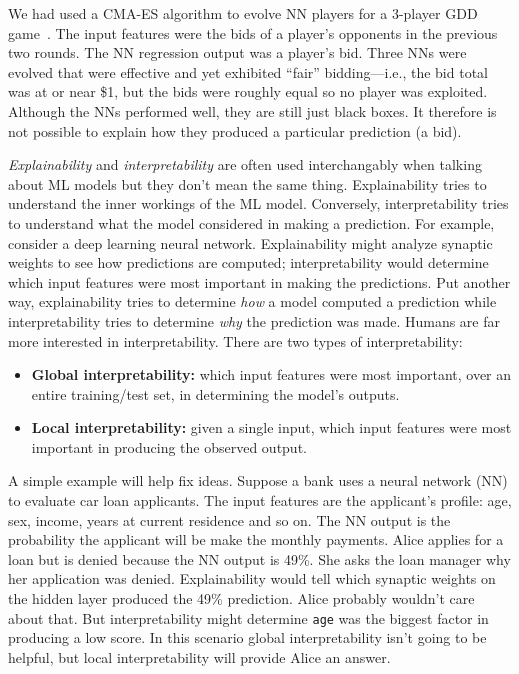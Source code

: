 \documentclass[journal]{IEEEtran} %
\begin{document}
We had used a CMA-ES algorithm to evolve NN players for a 3-player GDD game~\cite{gree2}. The input features were the bids of a player's opponents in the previous two rounds. The NN regression output was a player's bid. Three NNs were evolved that were effective and yet exhibited ``fair'' bidding---i.e., the bid total was at or near \$1, but the bids were roughly equal so no player was exploited. Although the NNs performed well, they are still just black boxes. 
It therefore is not possible to explain how they produced a particular prediction (a bid).

\emph{Explainability} and \emph{interpretability} are often used interchangably when talking about ML models but they don't mean the same thing. Explainability tries to understand the inner workings of the ML model. Conversely, interpretability tries to understand what the model considered in making a prediction. For example, consider a deep learning neural network. Explainability might analyze synaptic weights to see how predictions are computed; interpretability would determine which input features were most important in making the predictions. Put another way, explainability tries to determine \emph{how} a model computed a prediction while interpretability tries to determine \emph{why} the prediction was made. Humans are far more interested in interpretability.
There are two types of interpretability:
\begin{itemize}
    \item {\bf Global interpretability:} which input features were most important, over an entire training/test set, in determining the model's outputs.
    \item {\bf Local interpretability:} given a single input, which input features were most important in producing the observed output. 
\end{itemize}


A simple example will help fix ideas. Suppose a bank uses a neural network (NN) to evaluate car loan applicants. The input features are the applicant's profile: age, sex, income, years at current residence and so on. The NN output is the probability the applicant will be make the monthly payments. Alice applies for a loan but is denied because the NN output is 49\%. She asks the loan manager why her application was denied. Explainability would tell which synaptic weights on the hidden layer produced the 49\% prediction. Alice probably wouldn't care about that. But interpretability might determine \verb|age| was the biggest factor in producing a low score. 
In this scenario global interpretability isn't going to be helpful, but local interpretability will provide Alice an answer.
\end{document}
